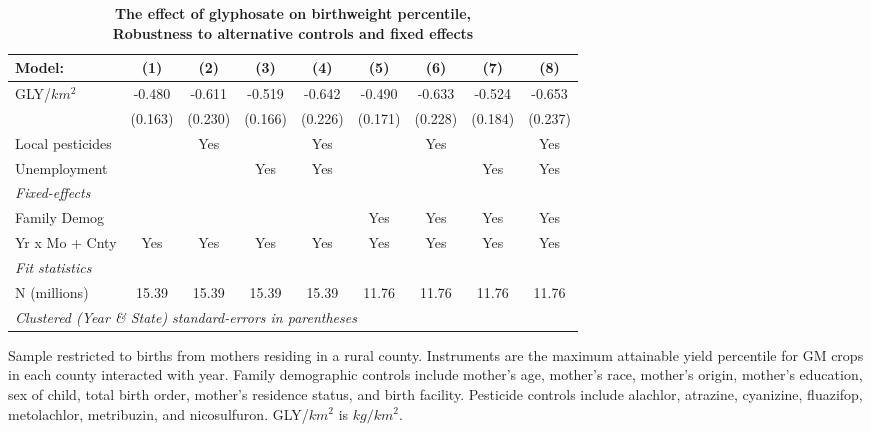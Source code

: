 \begin{table}[htbp]
   \centering
   \small
   \begin{threeparttable}[b]
      \caption{\label{tab:robust-cntrl-dbwt_pctl_pre-allyielddiffpercentilegmomax} \textbf{The effect of glyphosate on birthweight percentile, \\ Robustness to alternative controls and fixed effects}}
      \begin{tabular}{lcccccccc}
         \toprule
         Model:           & (1)     & (2)     & (3)     & (4)     & (5)     & (6)     & (7)     & (8)\\  
         \midrule 
         GLY/$km^2$       & -0.480  & -0.611  & -0.519  & -0.642  & -0.490  & -0.633  & -0.524  & -0.653\\   
                          & (0.163) & (0.230) & (0.166) & (0.226) & (0.171) & (0.228) & (0.184) & (0.237)\\   
         Local pesticides &         & Yes     &         & Yes     &         & Yes     &         & Yes\\  
         Unemployment     &         &         & Yes     & Yes     &         &         & Yes     & Yes\\  
         \midrule
         \emph{Fixed-effects}\\
         Family Demog     &         &         &         &         & Yes     & Yes     & Yes     & Yes\\  
         Yr x Mo + Cnty   & Yes     & Yes     & Yes     & Yes     & Yes     & Yes     & Yes     & Yes\\  
         \midrule
         \emph{Fit statistics}\\
         N (millions)     & 15.39   & 15.39   & 15.39   & 15.39   & 11.76   & 11.76   & 11.76   & 11.76\\  
         \midrule
         \multicolumn{9}{l}{\emph{Clustered (Year \& State) standard-errors in parentheses}}\\
      \end{tabular}
      
      \begin{tablenotes}\item Sample restricted to births from mothers residing in a rural county. Instruments are the maximum attainable yield percentile for GM crops in each county interacted with year. Family demographic controls include mother's age, mother's race, mother's origin, mother's education, sex of child, total birth order, mother's residence status, and birth facility. Pesticide controls include alachlor, atrazine, cyanizine, fluazifop, metolachlor, metribuzin, and nicosulfuron. GLY/$km^2$ is $kg/km^2$.
      \end{tablenotes}
   \end{threeparttable}
\end{table}
